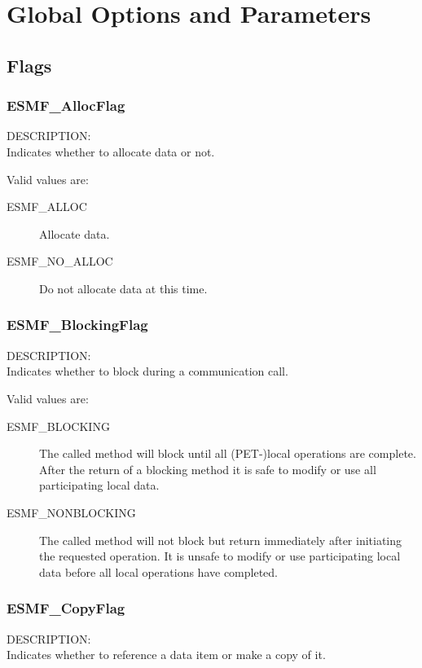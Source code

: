 
\section{Global Options and Parameters}

\subsection{Flags}

\subsubsection{ESMF\_AllocFlag}
\label{opt:allocflag}
{\sf DESCRIPTION:\\}  
Indicates whether to allocate data or not.

Valid values are:
\begin{description}
\item [ESMF\_ALLOC]
      Allocate data. 
\item [ESMF\_NO\_ALLOC]
      Do not allocate data at this time. 
\end{description}

\subsubsection{ESMF\_BlockingFlag}
\label{opt:blockingflag}
{\sf DESCRIPTION:\\}  
Indicates whether to block during a communication call.

Valid values are:
\begin{description}

\item [ESMF\_BLOCKING]
         The called method will block until all (PET-)local operations are 
         complete. After the return of a blocking method it is safe to modify
         or use all participating local data.
\item [ESMF\_NONBLOCKING]
         The called method will not block but return immediately after
         initiating the requested operation. It is unsafe to modify
         or use participating local data before all local operations have     
         completed.

\end{description}

\subsubsection{ESMF\_CopyFlag}
\label{opt:copyflag}
{\sf DESCRIPTION:\\}
Indicates whether to reference a data item or make a copy of it.

